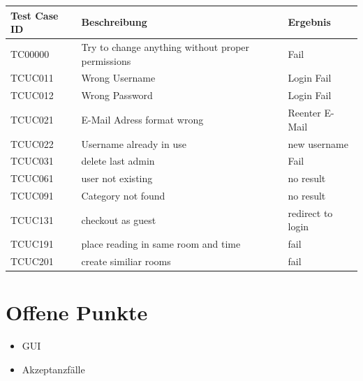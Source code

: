 \documentclass[a4paper]{article}
\begin{document}
\begin{longtable}{|p{50px}|p{250px}|p{50px}|}
	\hline
	\rowcolor[HTML]{C0C0C0} 
	Test Case ID & Beschreibung & Ergebnis \\ \hline
	TC00000 & Try to change anything without proper permissions & Fail \\ \hline
	TCUC011 & Wrong Username & Login Fail \\ \hline
	TCUC012 & Wrong Password & Login Fail \\ \hline
	TCUC021 & E-Mail Adress format wrong & Reenter E-Mail \\ \hline
	TCUC022 & Username already in use & new username \\ \hline
	TCUC031 & delete last admin & Fail \\ \hline
	TCUC061 & user not existing & no result \\ \hline
	TCUC091 & Category not found & no result \\ \hline
	TCUC131 & checkout as guest & redirect to login \\ \hline
	TCUC191 & place reading in same room and time & fail \\ \hline
	TCUC201 & create similiar rooms & fail \\ \hline
\end{longtable}

\section{Offene Punkte}

\begin{itemize}
	\item GUI
	\item Akzeptanzfälle
\end{itemize}
\end{document}

